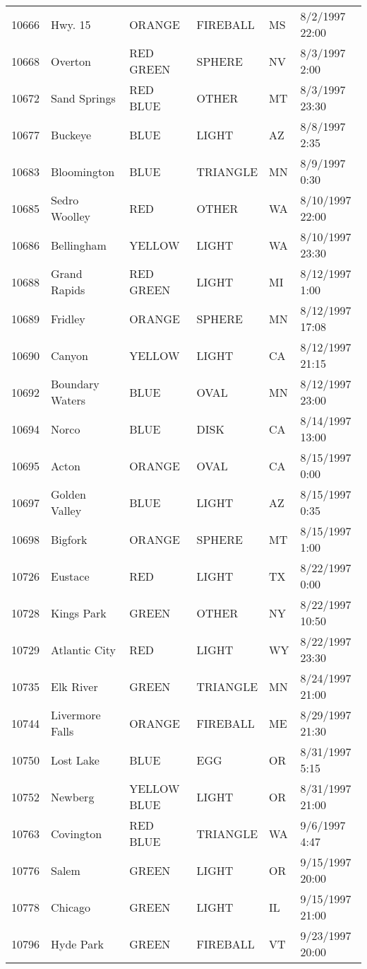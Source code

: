 \begin{tabular}{llllll}
10666 & Hwy. 15 & ORANGE & FIREBALL & MS & 8/2/1997 22:00 \\
10668 & Overton & RED GREEN & SPHERE & NV & 8/3/1997 2:00 \\
10672 & Sand Springs & RED BLUE & OTHER & MT & 8/3/1997 23:30 \\
10677 & Buckeye & BLUE & LIGHT & AZ & 8/8/1997 2:35 \\
10683 & Bloomington & BLUE & TRIANGLE & MN & 8/9/1997 0:30 \\
10685 & Sedro Woolley & RED & OTHER & WA & 8/10/1997 22:00 \\
10686 & Bellingham & YELLOW & LIGHT & WA & 8/10/1997 23:30 \\
10688 & Grand Rapids & RED GREEN & LIGHT & MI & 8/12/1997 1:00 \\
10689 & Fridley & ORANGE & SPHERE & MN & 8/12/1997 17:08 \\
10690 & Canyon & YELLOW & LIGHT & CA & 8/12/1997 21:15 \\
10692 & Boundary Waters & BLUE & OVAL & MN & 8/12/1997 23:00 \\
10694 & Norco & BLUE & DISK & CA & 8/14/1997 13:00 \\
10695 & Acton & ORANGE & OVAL & CA & 8/15/1997 0:00 \\
10697 & Golden Valley & BLUE & LIGHT & AZ & 8/15/1997 0:35 \\
10698 & Bigfork & ORANGE & SPHERE & MT & 8/15/1997 1:00 \\
10726 & Eustace & RED & LIGHT & TX & 8/22/1997 0:00 \\
10728 & Kings Park & GREEN & OTHER & NY & 8/22/1997 10:50 \\
10729 & Atlantic City & RED & LIGHT & WY & 8/22/1997 23:30 \\
10735 & Elk River & GREEN & TRIANGLE & MN & 8/24/1997 21:00 \\
10744 & Livermore Falls & ORANGE & FIREBALL & ME & 8/29/1997 21:30 \\
10750 & Lost Lake & BLUE & EGG & OR & 8/31/1997 5:15 \\
10752 & Newberg & YELLOW BLUE & LIGHT & OR & 8/31/1997 21:00 \\
10763 & Covington & RED BLUE & TRIANGLE & WA & 9/6/1997 4:47 \\
10776 & Salem & GREEN & LIGHT & OR & 9/15/1997 20:00 \\
10778 & Chicago & GREEN & LIGHT & IL & 9/15/1997 21:00 \\
10796 & Hyde Park & GREEN & FIREBALL & VT & 9/23/1997 20:00 \\

\end{tabular}
